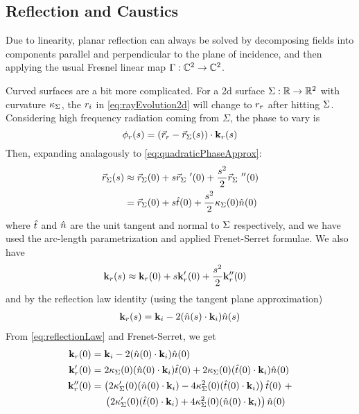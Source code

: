 \documentclass{article}
\begin{document}
\subsection{Reflection and Caustics}

Due to linearity, planar reflection can always be solved by decomposing fields into
components parallel and perpendicular to the plane of incidence, and then applying
the usual Fresnel linear map $\Gamma : \mathbb{C}^2 \to \mathbb{C}^2$.

Curved surfaces are a bit more complicated. For a 2d surface $\Sigma : \mathbb{R} \to
\mathbb{R}^2$ with curvature $\kappa_{\Sigma}$, the $r_i$ in
\eqref{eq:rayEvolution2d} will change to $r_r$ after hitting $\Sigma$.
Considering high frequency radiation coming from $\Sigma$, the phase to vary is
\begin{equation}
   \phi_{r}(s) = ( \vec{r}_r - \vec{r}_{\Sigma}(s) ) \cdot \mathbf{k}_r(s)
   \label{eq:phaseFromSurface}
\end{equation}
Then, expanding analagously to \eqref{eq:quadraticPhaseApprox}:
\begin{align}
   \vec{r}_{\Sigma}(s) & \approx \vec{r}_{\Sigma}(0) + s \vec{r}_{\Sigma} \ '(0) + \frac{s^2}{2} \vec{r}_{\Sigma} \
      ''(0) \nonumber \\
   &= \vec{r}_{\Sigma}(0) + s \hat{t}( 0 ) + \frac{s^2}{2} \kappa_{\Sigma} (0) \hat{n} (0 )
   \label{eq:surfaceApprox}
\end{align}
where $\hat{t}$ and $\hat{n}$ are the unit tangent and normal to $\Sigma$
respectively, and we have used the arc-length parametrization and applied
Frenet-Serret formulae. We also have 
\begin{align}
   \mathbf{k}_r(s) & \approx \mathbf{k}_r(0) + s \mathbf{k}_r '(0) + \frac{s^2}{2}
   \mathbf{k}_r ''(0)
\end{align}
and by the reflection law identity (using the tangent plane approximation)
\begin{align}
   \mathbf{k}_r(s) = \mathbf{k}_i - 2 (\hat{n}(s) \cdot \mathbf{k}_i) \hat{n}(s)
      \label{eq:reflectionLaw}
\end{align}
From \eqref{eq:reflectionLaw} and Frenet-Serret, we get
\begin{subequations}
\begin{align}
   \mathbf{k}_r(0) &= \mathbf{k}_i - 2 (\hat{n}(0) \cdot \mathbf{k}_i) \hat{n}(0) \\
   \mathbf{k}_r'(0) &= 2 \kappa_{\Sigma}(0) ( \hat{n}(0) \cdot \mathbf{k}_i )
      \hat{t}(0) + 2 \kappa_{\Sigma}(0) (\hat{t}(0) \cdot \mathbf{k}_i ) \hat{n}(0) \\
   \mathbf{k}_r''(0) &= \left( 2 \kappa_{\Sigma}'(0) ( \hat{n}(0) \cdot \mathbf{k}_i ) -
      4 \kappa_{\Sigma}^2(0) (\hat{t}(0) \cdot \mathbf{k}_i) \right) \hat{t}(0) \ +
      \nonumber \\
   & \quad \ \left( 2 \kappa_{\Sigma}'(0) ( \hat{t}(0) \cdot \mathbf{k}_i ) + 4
      \kappa_{\Sigma}^2(0) (\hat{n}(0) \cdot \mathbf{k}_i) \right) \hat{n}(0)
\end{align}
\end{subequations}
\end{document}
